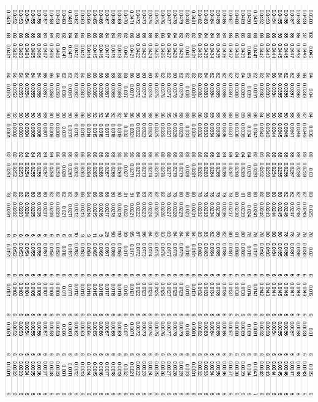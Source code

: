 \documentclass{article}
\begin{document}
\clearpage
\begin{center}
 \includegraphics[keepaspectratio,scale=0.85]{111_2000/005to000RSpinChart.png}
\end{center}
\clearpage
\end{document}
